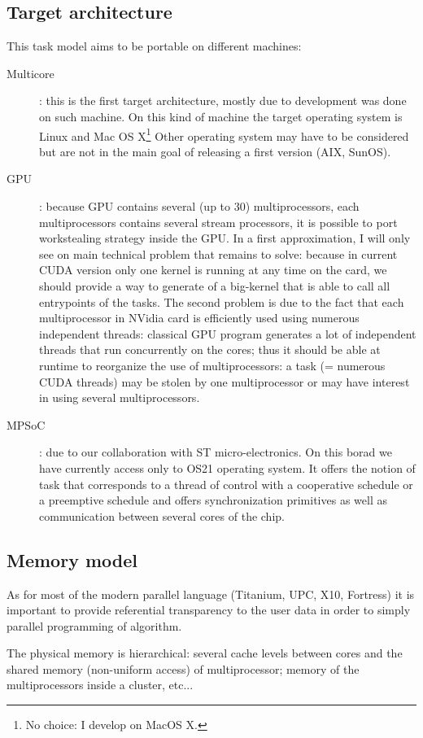 \documentclass[12pt]{report}
\begin{document}
\subsection{Target architecture}
This task model aims to be portable on different machines:
\begin{description}
\item [Multicore]: this is the first target architecture, mostly due to development was done on such machine. On this kind of machine the target operating system is Linux and Mac OS X\footnote{No choice: I develop on MacOS X.} Other operating system may have to be considered but are not in the main goal of releasing a first version (AIX, SunOS).
\item [GPU]: because GPU contains several (up to 30) multiprocessors, each multiprocessors contains several stream processors, it is possible to port workstealing strategy inside the GPU. In a first approximation, I will only see on main technical problem that remains to solve: because in current CUDA version only one kernel is running at any time on the card,
we should provide a way to generate of a big-kernel that is able to call all entrypoints of the tasks. The second problem is
due to the fact that each multiprocessor in NVidia card is efficiently used using numerous independent threads: classical GPU program generates a lot of independent threads that run concurrently on the cores; thus it should be able at runtime to reorganize the use of multiprocessors: a task (= numerous CUDA threads) may be stolen by one multiprocessor or may have interest in using several multiprocessors.
\item [MPSoC]: due to our collaboration with ST micro-electronics. On this borad we have currently access only to OS21 operating system. It offers the notion of task that corresponds to a thread of control with a cooperative schedule or a preemptive schedule and offers synchronization primitives as well as communication between several cores of the chip.
\end{description}


\subsection{Memory model}
As for most of the modern parallel language (Titanium, UPC, X10, Fortress) it is important to provide referential transparency to the user data in order to simply parallel programming of algorithm. 

The physical memory is hierarchical: several cache levels between cores and the shared memory (non-uniform access) of multiprocessor; memory of the multiprocessors inside a cluster, etc...
\end{document}
